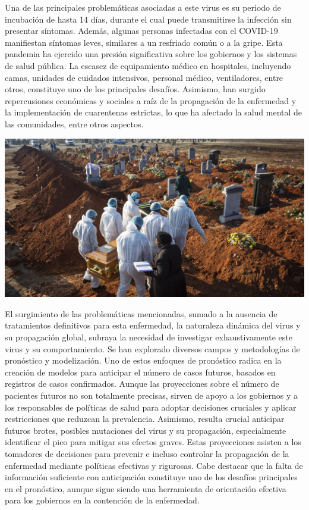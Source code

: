 \documentclass[
  us-letterpaper,
]{scrreprt}
\theoremstyle{plain}
\theoremstyle{definition}
\theoremstyle{plain}
\theoremstyle{definition}
\theoremstyle{remark}
\begin{document}
Una de las principales problemáticas asociadas a este virus es su
periodo de incubación de hasta 14 días, durante el cual puede
transmitirse la infección sin presentar síntomas. Además, algunas
personas infectadas con el COVID-19 manifiestan síntomas leves,
similares a un resfriado común o a la gripe. Esta pandemia ha ejercido
una presión significativa sobre los gobiernos y los sistemas de salud
pública. La escasez de equipamiento médico en hospitales, incluyendo
camas, unidades de cuidados intensivos, personal médico, ventiladores,
entre otros, constituye uno de los principales desafíos. Asimismo, han
surgido repercusiones económicas y sociales a raíz de la propagación de
la enfermedad y la implementación de cuarentenas estrictas, lo que ha
afectado la salud mental de las comunidades, entre otros aspectos.

\begin{center}
\includegraphics[width=5.3125in,height=\textheight]{Imagenes/COVID.jpeg}
\end{center}

El surgimiento de las problemáticas mencionadas, sumado a la ausencia de
tratamientos definitivos para esta enfermedad, la naturaleza dinámica
del virus y su propagación global, subraya la necesidad de investigar
exhaustivamente este virus y su comportamiento. Se han explorado
diversos campos y metodologías de pronóstico y modelización. Uno de
estos enfoques de pronóstico radica en la creación de modelos para
anticipar el número de casos futuros, basados en registros de casos
confirmados. Aunque las proyecciones sobre el número de pacientes
futuros no son totalmente precisas, sirven de apoyo a los gobiernos y a
los responsables de políticas de salud para adoptar decisiones cruciales
y aplicar restricciones que reduzcan la prevalencia. Asimismo, resulta
crucial anticipar futuros brotes, posibles mutaciones del virus y su
propagación, especialmente identificar el pico para mitigar sus efectos
graves. Estas proyecciones asisten a los tomadores de decisiones para
prevenir e incluso controlar la propagación de la enfermedad mediante
políticas efectivas y rigurosas. Cabe destacar que la falta de
información suficiente con anticipación constituye uno de los desafíos
principales en el pronóstico, aunque sigue siendo una herramienta de
orientación efectiva para los gobiernos en la contención de la
enfermedad.
\end{document}
